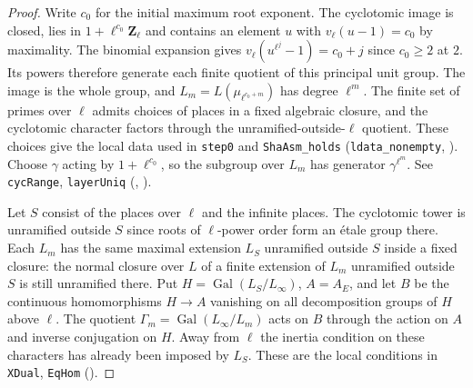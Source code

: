 \begin{proof}
Write $c_0$ for the initial maximum root exponent. The cyclotomic image
is closed, lies in $1+\ell^{c_0}\mathbf Z_\ell$ and contains an element
$u$ with $v_\ell(u-1)=c_0$ by maximality. The binomial expansion gives
$v_\ell(u^{\ell^j}-1)=c_0+j$ since $c_0\ge2$ at $2$. Its powers
therefore generate each finite quotient of this principal unit group.
The image is the whole group, and $L_m=L(\mu_{\ell^{c_0+m}})$ has
degree $\ell^m$. The finite set of primes over $\ell$ admits choices of places in a
fixed algebraic closure, and the cyclotomic character factors through the
unramified-outside-$\ell$ quotient. These choices give the local data
used in \nolinkurl{step0} and \nolinkurl{ShaAsm_holds}
(\nolinkurl{ldata_nonempty}, ).
Choose $\gamma$ acting by $1+\ell^{c_0}$, so the
subgroup over $L_m$ has generator $\gamma^{\ell^m}$. See
\nolinkurl{cycRange}, \nolinkurl{layerUniq}
(, ).

Let $S$ consist of the places over $\ell$ and the infinite places.
The cyclotomic tower is unramified outside $S$ since roots of
$\ell$-power order form an \'etale group there. Each $L_m$ has the same
maximal extension $L_S$ unramified outside $S$ inside a fixed closure:
the normal closure over $L$ of a finite extension of $L_m$ unramified
outside $S$ is still unramified there. Put $H=\operatorname{Gal}(L_S/L_\infty)$,
$A=A_E$, and let $B$ be the continuous homomorphisms $H\to A$
vanishing on all decomposition groups of $H$ above $\ell$.
The quotient $\Gamma_m=\operatorname{Gal}(L_\infty/L_m)$ acts on
$B$ through the action on $A$ and inverse conjugation on $H$.
Away from $\ell$ the inertia condition on these characters has already
been imposed by $L_S$. These are the local conditions in
\nolinkurl{XDual}, \nolinkurl{EqHom}
().


\end{proof}
